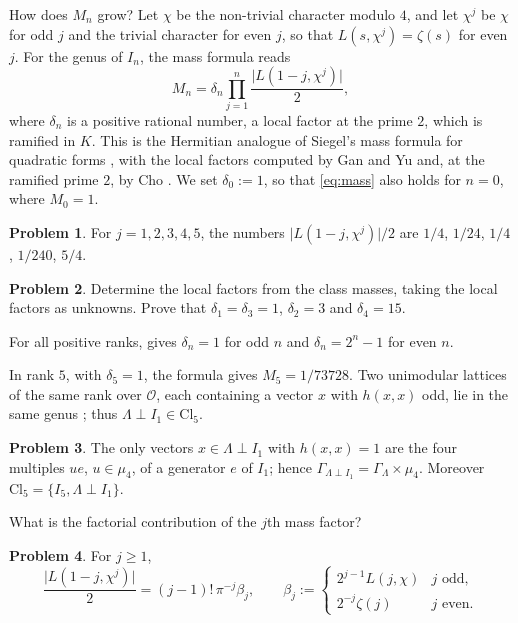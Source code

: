 \documentclass[reqno]{amsart}
\theoremstyle{definition}
\newtheorem{problem}{Problem}[section]
\theoremstyle{plain}
\newcommand{\Oc}{\mathcal{O}}
\newcommand{\Cl}{\mathrm{Cl}}
\begin{document}
How does \(M_n\) grow?  Let \(\chi\) be the non-trivial character modulo \(4\), and let \(\chi^j\) be \(\chi\) for odd \(j\) and the trivial character for even \(j\), so that \(L(s, \chi^j) = \zeta(s)\) for even \(j\).  For the genus of \(I_n\), the mass formula reads
\begin{equation}\label{eq:mass}
  M_n = \delta_n \prod_{j=1}^{n} \frac{\lvert L(1-j, \chi^j) \rvert}{2},
\end{equation}
where \(\delta_n\) is a positive rational number, a local factor at the prime \(2\), which is ramified in \(K\).  This is the Hermitian analogue of Siegel's mass formula for quadratic forms \cite{Si}, with the local factors computed by Gan and Yu \cite{GY} and, at the ramified prime \(2\), by Cho \cite{Cho}.  We set \(\delta_0 := 1\), so that \eqref{eq:mass} also holds for \(n = 0\), where \(M_0 = 1\).

\begin{problem}\label{pr:Lvalues}
For \(j = 1, 2, 3, 4, 5\), the numbers \(\lvert L(1-j, \chi^j) \rvert / 2\) are \(1/4\), \(1/24\), \(1/4\), \(1/240\), \(5/4\).
\end{problem}

\begin{problem}\label{pr:delta}
Determine the local factors from the class masses, taking the local factors as unknowns.  Prove that \(\delta_1=\delta_3=1\), \(\delta_2=3\) and \(\delta_4=15\).
\end{problem}

For all positive ranks, \cite[Corollary~4.3]{JZ} gives \(\delta_n=1\) for odd \(n\) and \(\delta_n=2^n-1\) for even \(n\).

In rank \(5\), with \(\delta_5 = 1\), the formula gives \(M_5 = 1/73728\).  Two unimodular lattices of the same rank over \(\Oc\), each containing a vector \(x\) with \(h(x,x)\) odd, lie in the same genus \cite[Corollary~2.2]{JZ}; thus \(\Lambda \perp I_1 \in \Cl_5\).

\begin{problem}\label{pr:rank-five}
The only vectors \(x \in \Lambda \perp I_1\) with \(h(x,x) = 1\) are the four multiples \(u e\), \(u \in \mu_4\), of a generator \(e\) of \(I_1\); hence \(\Gamma_{\Lambda \perp I_1} = \Gamma_\Lambda \times \mu_4\).  Moreover \(\Cl_5 = \{I_5, \Lambda \perp I_1\}\).
\end{problem}

What is the factorial contribution of the \(j\)th mass factor?

\begin{problem}\label{pr:FE}
For \(j \ge 1\),
\[
  \frac{\lvert L(1-j, \chi^j) \rvert}{2} = (j-1)!\, \pi^{-j} \beta_j,
  \qquad
  \beta_j :=
  \begin{cases}
    2^{j-1} L(j, \chi) & j \text{ odd},\\
    2^{-j} \zeta(j) & j \text{ even}.
  \end{cases}
\]
\end{problem}
\end{document}
